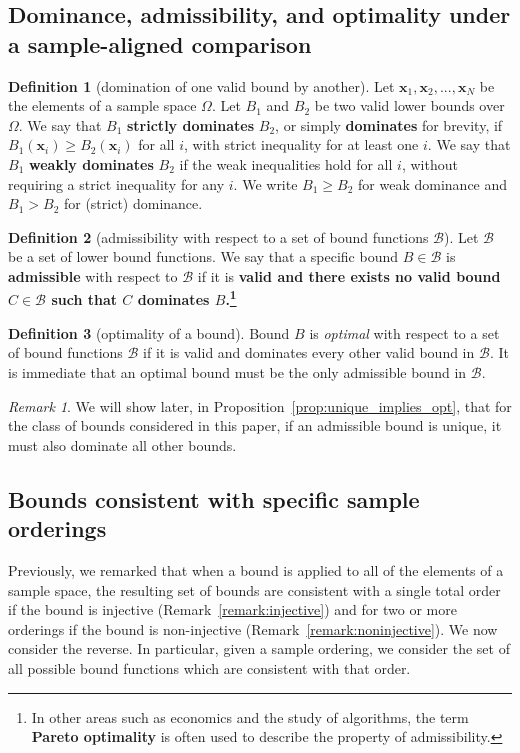 \documentclass{article}
\theoremstyle{definition}
\newtheorem{definition}{Definition}[section]
\theoremstyle{remark}
\newtheorem{remark}[theorem]{Remark}
\def\x{\mathbf{x}}
\begin{document}
\subsection{Dominance, admissibility, and optimality under a sample-aligned comparison}
\begin{definition}[domination of one valid bound by another]
Let $\x_1,\x_2,...,\x_N$ be the elements of a sample space $\Omega$. Let $B_1$ and $B_2$ be two valid lower bounds over $\Omega$. We say that $B_1$ {\bf strictly dominates}  $B_2$, or simply {\bf dominates} for brevity, if $B_1(\x_i) \geq B_2(\x_i)$ for all $i$, with strict inequality for at least one $i$. We say that $B_1$ {\bf weakly dominates} $B_2$ if the weak inequalities hold for all $i$, without requiring a strict inequality for any $i$. We write $B_1 \geq B_2$ for weak dominance and $B_1>B_2$ for (strict) dominance.\color{black}
\end{definition}

\begin{definition}[admissibility with respect to a set of bound functions $\mathcal{B}$]
\label{def:admissibility}
Let $\mathcal{B}$ be a set of lower bound functions. We say that a specific bound $B\in \mathcal{B}$ is \textbf{admissible} with respect to $\mathcal{B}$ if it is \bf{valid} and there exists no \bf{valid} bound $C\in\mathcal{B}$ such that $C$ dominates $B$.\footnote{In other areas such as economics and the study of algorithms, the term {\bf Pareto optimality} is often used to describe the property of admissibility.}
\end{definition}


\begin{definition}[optimality of a bound]
\label{def:opt}
    Bound $B$ is \emph{optimal} with respect to  a set of bound functions $\mathcal{B}$ if it is valid and dominates every other valid bound in $\mathcal{B}$. It is immediate that an optimal bound must be the only admissible bound in $\mathcal{B}$. 
\end{definition}

\begin{remark}
     We will show later, in Proposition~\ref{prop:unique_implies_opt}, that for the class of bounds considered in this paper, if an admissible bound is unique, it must also dominate all other bounds.
\end{remark}
\color{black}
 

\subsection{Bounds consistent with specific sample orderings}
Previously, we remarked that when a bound is applied to all of the elements of a sample space, the resulting set of bounds are consistent with a single total order if the bound is injective (Remark~\ref{remark:injective}) and for two or more orderings if the bound is non-injective (Remark~\ref{remark:noninjective}).
We now consider the reverse.  In particular, given a sample ordering, we consider the set of all possible bound functions which are consistent with that order.
\end{document}
